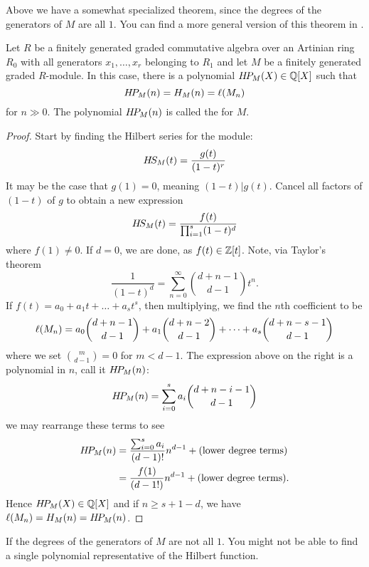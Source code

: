 \documentclass{ximera}
\begin{document}
\begin{remark}
  Above we have a somewhat specialized theorem, since the degrees of
  the generators of $M$ are all $1$. You can find a more general
  version of this theorem in \cite{AM1969,hM1986}.
\end{remark}


\begin{corollary}\label{C:hp}
  Let $R$ be a finitely generated graded commutative algebra over an
  Artinian ring $R_0$ with all generators $x_1,\dots,x_r$ belonging to
  $R_1$ and let $M$ be a finitely generated graded $R$-module. In this
  case, there is a polynomial $H\!P_M(X)\in\mathbb Q[X]$ such that
  \[
  H\!P_M(n) = H_M(n) = \ell(M_n)
  \]
  for $n\gg 0$. The polynomial $H\!P_M(n)$ is called the
   for $M$.
  \begin{proof}
    Start by finding the Hilbert series for the module:
    \[
    H\!S_M(t) = \frac{g(t)}{(1-t)^r}
    \]
    It may be the case that $g(1) = 0$, meaning $(1-t)|g(t)$. Cancel
    all factors of $(1-t)$ of $g$ to obtain a new expression
    \[
    H\!S_M(t) = \frac{f(t)}{\prod_{i=1}^s(1-t)^d}
    \]
    where $f(1) \ne 0$. If $d=0$, we are done, as $f(t)\in
    \mathbb Z[t]$. Note, via Taylor's theorem
    \[
    \frac{1}{(1-t)^d} = \sum_{n=0}^\infty \binom{d+n-1}{d-1}t^n.
    \]
    If $f(t) = a_0 + a_1 t + \dots + a_s t^s$, then multiplying, we
    find the $n$th coefficient to be
    \[
    \ell(M_n) = a_0 \binom{d+n-1}{d-1} + a_1 \binom{d+n-2}{d-1} + \dots + a_s \binom{d+n-s-1}{d-1}
    \]
    where we set $\binom{m}{d-1} = 0$ for $m<d-1$. The expression
    above on the right is a polynomial in $n$, call it $H\!P_M(n)$:
    \[
    H\!P_M(n) = \sum_{i=0}^s a_i \binom{d+n-i-1}{d-1}
    \]
    we may rearrange these terms to see
    \begin{align*}
    H\!P_M(n) &= \frac{\sum_{i=0}^s a_i}{(d-1)!}n^{d-1} + (\text{lower degree terms})\\
    &= \frac{f(1)}{(d-1!)}n^{d-1}  + (\text{lower degree terms}).
    \end{align*}
    Hence $H\!P_M(X)\in \mathbb Q[X]$ and if $n\ge s+1-d$, we have $\ell(M_n) =
    H_M(n) = H\!P_M(n)$.
    \end{proof}
\end{corollary}

\begin{remark}
   If the degrees of the generators of $M$ are not all $1$. You might
   not be able to find a single polynomial representative of the
   Hilbert function.
\end{remark}
\end{document}
